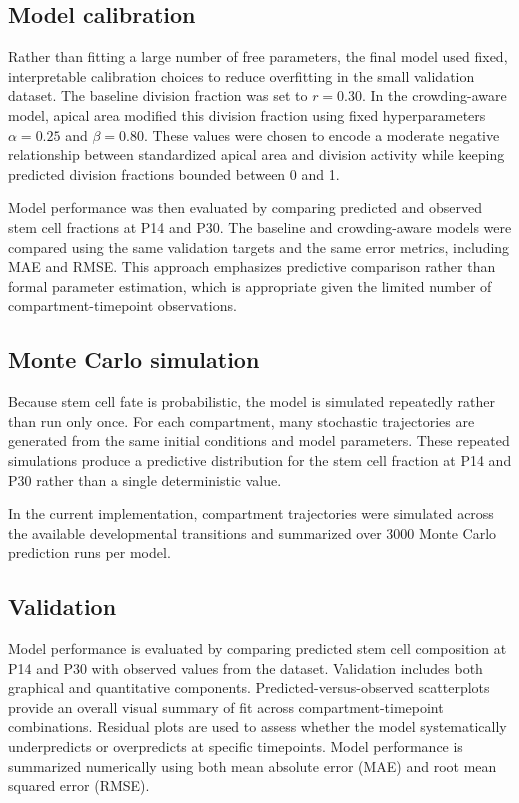 \documentclass[12pt]{article}
\begin{document}
\subsection{Model calibration}

Rather than fitting a large number of free parameters, the final model used fixed, interpretable calibration choices to reduce overfitting in the small validation dataset. The baseline division fraction was set to $r=0.30$. In the crowding-aware model, apical area modified this division fraction using fixed hyperparameters $\alpha=0.25$ and $\beta=0.80$. These values were chosen to encode a moderate negative relationship between standardized apical area and division activity while keeping predicted division fractions bounded between 0 and 1.

Model performance was then evaluated by comparing predicted and observed stem cell fractions at P14 and P30. The baseline and crowding-aware models were compared using the same validation targets and the same error metrics, including MAE and RMSE. This approach emphasizes predictive comparison rather than formal parameter estimation, which is appropriate given the limited number of compartment-timepoint observations.

\subsection{Monte Carlo simulation}

Because stem cell fate is probabilistic, the model is simulated repeatedly rather than run only once. For each compartment, many stochastic trajectories are generated from the same initial conditions and model parameters. These repeated simulations produce a predictive distribution for the stem cell fraction at P14 and P30 rather than a single deterministic value.

In the current implementation, compartment trajectories were simulated across the available developmental transitions and summarized over 3000 Monte Carlo prediction runs per model.

\subsection{Validation}

Model performance is evaluated by comparing predicted stem cell composition at P14 and P30 with observed values from the dataset. Validation includes both graphical and quantitative components. Predicted-versus-observed scatterplots provide an overall visual summary of fit across compartment-timepoint combinations. Residual plots are used to assess whether the model systematically underpredicts or overpredicts at specific timepoints. Model performance is summarized numerically using both mean absolute error (MAE) and root mean squared error (RMSE).
\end{document}
